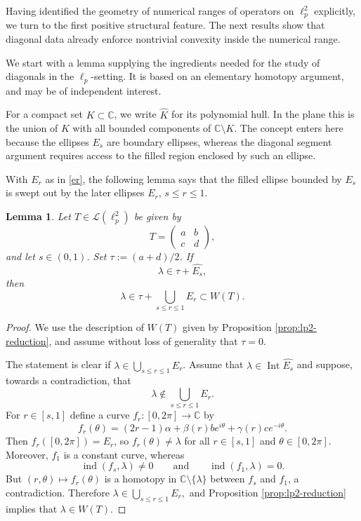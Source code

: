 \documentclass[11pt]{amsart}
\numberwithin{equation}{section}
\newtheorem{lemma}[theorem]{Lemma}
\theoremstyle{definition}
\theoremstyle{remark}
\DeclareMathOperator{\Int}{Int}
\newcommand{\C}{\mathbb{C}}
\begin{document}
Having identified the geometry of numerical ranges of operators on $\ell_p^2$ explicitly, we turn to the first positive structural feature. The next results show that diagonal data already enforce nontrivial convexity inside the numerical range.

We start with a lemma supplying the ingredients needed for the study of diagonals in the $\ell_p$-setting.
It is based on an elementary homotopy argument, and
may be of independent interest. 

For a compact set $K\subset\C$, we write $\widehat K$ for its polynomial hull. In the plane this is the union of $K$ with all bounded components of $\C\setminus K$. The concept enters here because the ellipses $E_s$ are boundary ellipses, whereas the diagonal segment argument requires access to the filled region enclosed by such an ellipse.



With \(E_r\) as in \eqref{er}, the following lemma says that the filled
ellipse bounded by \(E_s\) is swept out by the later ellipses \(E_r\),
\(s\le r\le1\).
\begin{lemma}\label{lem:lp2-hull-step}
 Let \(T\in \mathcal L(\ell_p^2)\) be given by
\[
        T=
        \begin{pmatrix}
        a & b\\
        c & d
        \end{pmatrix},
\]
and let \(s\in(0,1)\). Set \(\tau:=(a+d)/2\). If
\[
        \lambda\in \tau+\widehat{E_s},
\]
then
\[
        \lambda\in \tau+\bigcup_{s\le r\le1}E_r\subset W(T).
\]
\end{lemma}
\begin{proof}
We use the description of $W(T)$ given by Proposition \ref{prop:lp2-reduction},
and assume without loss of generality that $\tau=0$.


The statement is clear if \(\lambda\in\bigcup_{s\le r\le1}E_r\). Assume that $\lambda\in \Int \widehat{E_s}$ and suppose, towards a contradiction, that
\[
\lambda\notin \bigcup_{s\le r\le1}E_r. 
\]
For $r\in[s,1]$ define a curve $f_r:[0,2\pi]\to\C$ by
\[
f_r(\theta)=(2r-1)\alpha+\beta(r)be^{i\theta}+\gamma(r)ce^{-i\theta}.
\]
Then $f_r([0,2\pi])=E_r$, so $f_r(\theta)\ne \lambda$ for all $r\in[s,1]$ and $\theta\in[0,2\pi]$.
Moreover, $f_1$ is a constant curve, whereas
\[
\operatorname{ind}(f_s,\lambda)\ne 0
\qquad\text{and}\qquad
\operatorname{ind}(f_1,\lambda)=0.
\]
But $(r,\theta)\mapsto f_r(\theta)$ is a homotopy in $\C\setminus\{\lambda\}$ between $f_s$ and $f_1$, a contradiction.
Therefore
\(
\lambda\in \bigcup_{s\le r\le1}E_r,
\)
and Proposition \ref{prop:lp2-reduction} implies that $\lambda \in W(T).$
\end{proof}
\end{document}
